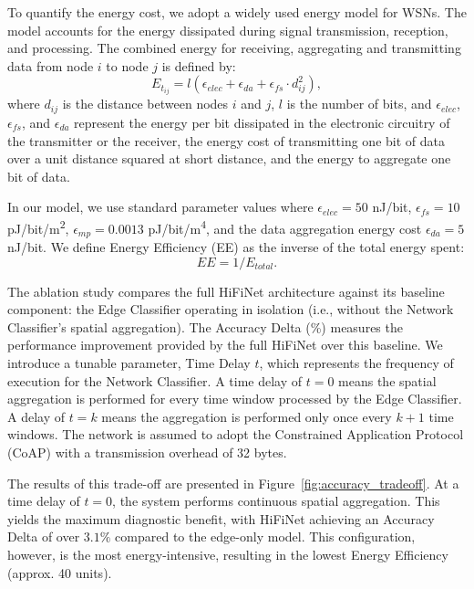 To quantify the energy cost, we adopt a widely used energy model for WSNs. The model accounts for the energy dissipated during signal transmission, reception, and processing. The combined energy for receiving, aggregating and transmitting data from node \(i\) to node \(j\) is defined by:
\begin{equation}
  E_{t_{ij}} = l (\epsilon_{elec} + \epsilon_{da} + \epsilon_{fs} \cdot d^2_{ij}),
\end{equation}
where \(d_{ij}\) is the distance between nodes \(i\) and \(j\), \(l\) is the number of bits, and \(\epsilon_{elec}\), \(\epsilon_{fs}\), and \(\epsilon_{da}\) represent the energy per bit dissipated in the electronic circuitry of the transmitter or the receiver, the energy cost of transmitting one bit of data over a unit distance squared at short distance, and the energy to aggregate one bit of data.

In our model, we use standard parameter values where \(\epsilon_{elec} = 50\) \si{nJ/bit}, \(\epsilon_{fs} = 10\) \si{pJ/bit/m^2}, \(\epsilon_{mp} = 0.0013\) \si{pJ/bit/m^4}, and the data aggregation energy cost \(\epsilon_{da} = 5 \) \si{nJ/bit}. We define Energy Efficiency (EE) as the inverse of the total energy spent:
\begin{equation}
  EE = 1 / E_{total}.
\end{equation}

The ablation study compares the full HiFiNet architecture against its baseline component: the Edge Classifier operating in isolation (i.e., without the Network Classifier's spatial aggregation). The Accuracy Delta (\%) measures the performance improvement provided by the full HiFiNet over this baseline. We introduce a tunable parameter, Time Delay \(t\), which represents the frequency of execution for the Network Classifier. A time delay of \(t=0\) means the spatial aggregation is performed for every time window processed by the Edge Classifier. A delay of \(t=k\) means the aggregation is performed only once every \(k+1\) time windows. The network is assumed to adopt the Constrained Application Protocol (CoAP) with a transmission overhead of 32 bytes. 

The results of this trade-off are presented in Figure~\ref{fig:accuracy_tradeoff}. At a time delay of \(t=0\), the system performs continuous spatial aggregation. This yields the maximum diagnostic benefit, with HiFiNet achieving an Accuracy Delta of over \(3.1\%\) compared to the edge-only model. This configuration, however, is the most energy-intensive, resulting in the lowest Energy Efficiency (approx. 40 units).

